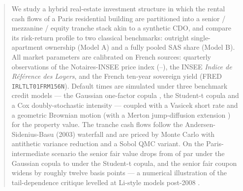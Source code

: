 \begin{abstract}\noindent
We study a hybrid real-estate investment structure in which the rental cash
flows of a Paris residential building are partitioned into a senior /
mezzanine / equity tranche stack akin to a synthetic CDO, and compare its
risk-return profile to two classical benchmarks: outright single-apartment
ownership (Model A) and a fully pooled SAS share (Model B). All market
parameters are calibrated on French sources: \dataParisN{} quarterly observations of the
Notaires-INSEE price index (\dataParisStart{}--\dataParisEnd{}), the INSEE
\textit{Indice de Référence des Loyers}, and the French ten-year sovereign
yield (FRED \texttt{IRLTLT01FRM156N}). Default times are simulated under
three benchmark credit models — the Gaussian one-factor copula
\autocite{Li2000, Vasicek2002}, the Student-t copula
\autocite{EmbrechtsMcNeilStraumann2002} and a Cox doubly-stochastic
intensity \autocite{DuffieSingleton2003} — coupled with a Vasicek short rate
\autocite{Vasicek1977} and a geometric Brownian motion (with a Merton
jump-diffusion extension \autocite{Merton1976}) for the property value. The
tranche cash flows follow the Andersen-Sidenius-Basu (2003) waterfall and
are priced by Monte Carlo with antithetic variance reduction and a Sobol
QMC variant. On the Paris-intermediate scenario the senior fair value drops from
\seniorFairGauss{} of par under the Gaussian copula to
\seniorFairStudent{} under the Student-t copula, and the senior fair
coupon widens by roughly twelve basis points --- a numerical
illustration of the tail-dependence critique levelled at Li-style
models post-2008 \autocite{DonnellyEmbrechts2010, MacKenzieSpears2014}.
\end{abstract}
